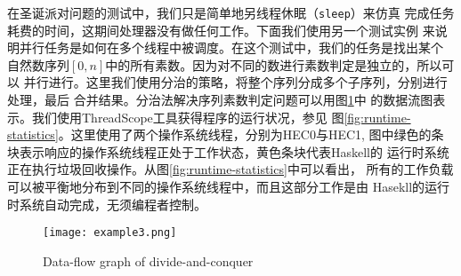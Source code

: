 \documentclass[conference]{IEEEtran}
\begin{document}
在圣诞派对问题的测试中，我们只是简单地另线程休眠（\texttt{sleep}）来仿真
完成任务耗费的时间，这期间处理器没有做任何工作。下面我们使用另一个测试实例
来说明并行任务是如何在多个线程中被调度。在这个测试中，我们的任务是找出某个
自然数序列$[0, n]$中的所有素数。因为对不同的数进行素数判定是独立的，所以可以
并行进行。这里我们使用分治的策略，将整个序列分成多个子序列，分别进行处理，最后
合并结果。分治法解决序列素数判定问题可以用图\ref{fig:divide-and-conquer}中
的数据流图表示。我们使用ThreadScope工具获得程序的运行状况，参见
图\ref{fig:runtime-statistics}。这里使用了两个操作系统线程，分别为HEC0与HEC1,
图中绿色的条块表示响应的操作系统线程正处于工作状态，黄色条块代表Haskell的
运行时系统正在执行垃圾回收操作。从图\ref{fig:runtime-statistics}中可以看出，
所有的工作负载可以被平衡地分布到不同的操作系统线程中，而且这部分工作是由
Hasekll的运行时系统自动完成，无须编程者控制。
\begin{figure}
  \centering
  \texttt{[image: example3.png]}
  \caption{Data-flow graph of divide-and-conquer}
  \label{fig:divide-and-conquer}
\end{figure}
\begin{figure*}[!t]
  \centerline{
    \hfil
  }
  \caption{Runtime statistics of divide-and-conquer}
  \label{fig:runtime-statistics}
\end{figure*}
\end{document}
